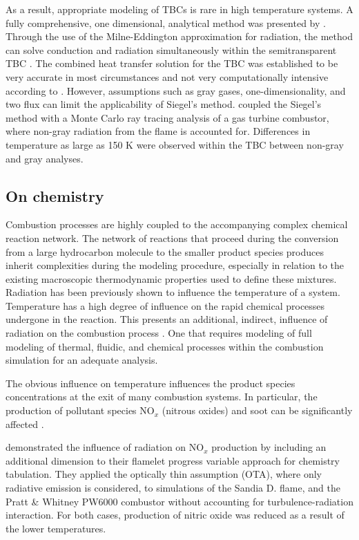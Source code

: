 As a result, appropriate modeling of TBCs is rare in high temperature systems. A fully comprehensive, one dimensional, analytical method was presented by \citet{Siegel1996InternalCoatings}. Through the use of the Milne-Eddington approximation for radiation, the method can solve conduction and radiation simultaneously
within the semitransparent TBC \cite{Milne1930ThermodynamicsStars,Eddington1920TheStars}. The combined heat transfer solution for the TBC was established to be very accurate in most circumstances and not very computationally intensive according to \citet{Siegel1996InternalCoatings}. 
However, assumptions such as gray gases, one-dimensionality, and two flux can limit the applicability of Siegel’s method. \citet{Johnson2021AnalysisMethod} coupled the Siegel’s method with a Monte Carlo ray tracing analysis of a gas turbine combustor, where non-gray radiation from the flame is accounted for. Differences in temperature as large as 150 K were observed within the TBC between non-gray and gray analyses.

\subsection{On chemistry}
Combustion processes are highly coupled to the accompanying complex chemical reaction network.
The network of reactions that proceed during the conversion from a large hydrocarbon molecule to the smaller product species produces inherit complexities during the modeling procedure, especially in relation to the existing macroscopic thermodynamic properties used to define these mixtures.
Radiation has been previously shown to influence the temperature of a system. Temperature has a high degree of influence on the rapid chemical processes undergone in the reaction.
This presents an additional, indirect, influence of radiation on the combustion process . One that requires modeling of full modeling of thermal, fluidic, and chemical processes within the combustion simulation for an adequate analysis.

The obvious influence on temperature influences the product species concentrations at the exit of many combustion systems. In particular, the production of pollutant species NO$_x$ (nitrous oxides) and soot can be significantly affected \cite{Viskanta2010RadiativeSystems}.

\citet{Ihme2008ModelingFormulation} demonstrated the influence of radiation on NO$_x$ production by including an additional dimension to their flamelet progress variable approach for chemistry tabulation.
They applied the optically thin assumption (OTA), where only radiative emission is considered, to simulations of the Sandia D. flame, and the Pratt \& Whitney PW6000 combustor without accounting for turbulence-radiation interaction.
For both cases, production of nitric oxide was reduced as a result of the lower temperatures.

